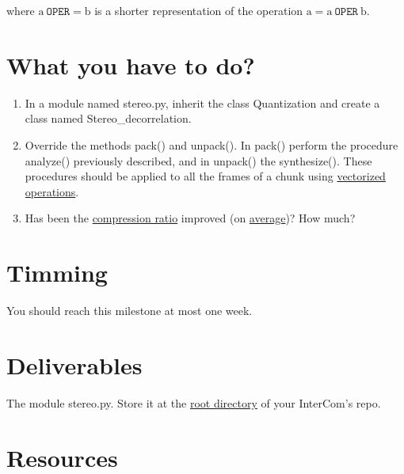 where $\text{a}~\mathtt{OPER}= \text{b}$ is a shorter representation of the operation
$\text{a} = \text{a}~\mathtt{OPER}~\text{b}$.

\section{What you have to do?}

\begin{enumerate}
\item In a module named stereo.py, inherit the class
  Quantization and create a class named Stereo\_decorrelation.
\item Override the methods pack() and unpack(). In
  pack() perform the procedure analyze() previously
  described, and in unpack() the
  synthesize(). These procedures should be applied to
  all the frames of a chunk using \href{https://www.oreilly.com/library/view/python-for-data/9781449323592/ch04.html}{vectorized
    operations}.
\item Has been the
  \href{https://en.wikipedia.org/wiki/Data_compression_ratio}{compression
    ratio} improved (on
  \href{https://en.wikipedia.org/wiki/Average}{average})? How much?
\end{enumerate}

\section{Timming}

You should reach this milestone at most one week.

\section{Deliverables}

The module stereo.py. Store it at the
\href{https://github.com/Tecnologias-multimedia/intercom}{root
  directory} of your InterCom's repo.

\section{Resources}


